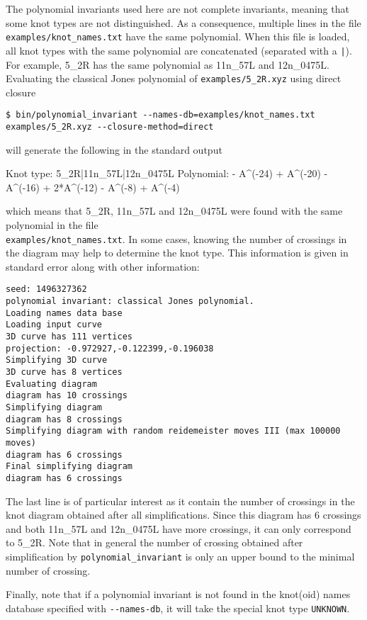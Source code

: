 The polynomial invariants used here are not complete invariants, meaning that some knot types are not distinguished. 
As a consequence, multiple lines in the file \lstinline{examples/knot_names.txt} have the same polynomial. When this file is loaded, all knot types with the same polynomial are concatenated (separated with a \lstinline{|}). For example, 5\_2R has the same polynomial as 11n\_57L and 12n\_0475L. Evaluating the classical Jones polynomial of \lstinline{examples/5_2R.xyz} using direct closure 
\begin{lstlisting}
$ bin/polynomial_invariant --names-db=examples/knot_names.txt examples/5_2R.xyz --closure-method=direct
\end{lstlisting}
will generate the following in the standard output
\begin{lstlistingsmall}
Knot type: 5_2R|11n_57L|12n_0475L  Polynomial:  - A^(-24) + A^(-20) - A^(-16) + 2*A^(-12) - A^(-8) + A^(-4)
\end{lstlistingsmall}
which means that 5\_2R, 11n\_57L and 12n\_0475L were found with the same polynomial in the file\\
\lstinline{examples/knot_names.txt}. In some cases, knowing the number of crossings in the diagram may help to determine the knot type. This information is given in standard error along with other information:
\begin{lstlisting}
seed: 1496327362
polynomial invariant: classical Jones polynomial.
Loading names data base
Loading input curve
3D curve has 111 vertices
projection: -0.972927,-0.122399,-0.196038
Simplifying 3D curve
3D curve has 8 vertices
Evaluating diagram
diagram has 10 crossings
Simplifying diagram
diagram has 8 crossings
Simplifying diagram with random reidemeister moves III (max 100000 moves)
diagram has 6 crossings
Final simplifying diagram
diagram has 6 crossings
\end{lstlisting}
The last line is of particular interest as it contain the number of crossings in the knot diagram obtained after all simplifications. Since this diagram has 6 crossings and both 11n\_57L and 12n\_0475L have more crossings, it can only correspond to 5\_2R. Note that in general the number of crossing obtained after simplification by \lstinline{polynomial_invariant} is only an upper bound to the minimal number of crossing.

Finally, note that if a polynomial invariant is not found in the knot(oid) names database specified with  \lstinline{--names-db}, it will take the special knot type \lstinline{UNKNOWN}.

